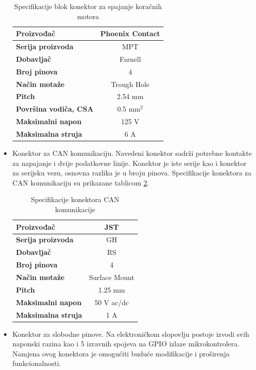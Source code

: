 \documentclass[11pt,a4paper]{article}
\begin{document}
\begin{center}
\begin{itemize}
\begin{table}[H]
	\centering
	\caption{Specifikacije blok konektor za spajanje koračnih motora}
	\label{tab:specifikacija_connector_terminal}
	\begin{tabular}{|l|c|}
		\hline
		\textbf{Proizvođač} & Phoenix Contact \\ \hline 
		\textbf{Serija proizvoda} & MPT \\ \hline 
		\textbf{Dobavljač} & Farnell \\ \hline 
		\textbf{Broj pinova} & 4 \\ \hline 
		\textbf{Način motaže} & Trough Hole    \\ \hline
		\textbf{Pitch} & 2.54 mm    \\ \hline 
		\textbf{Površina vodiča, CSA} & 0.5 mm$^2$     \\ \hline 
		\textbf{Maksimalni napon} & 125 V \\ \hline 
		\textbf{Maksimalna struja} & 6 A \\ \hline
	\end{tabular}
\end{table}
		
		
		\item Konektor za CAN komunikaciju. Navedeni konektor sadrži potrebne kontakte za napajanje i dvije podatkovne linije. Konektor je iste serije kao i konektor za serijsku vezu, osnovna razlika je u broju pinova. Specifikacije konektora za CAN komunikaciju su prikazane tablicom \ref{tab:specifikacija_connector_CAN}.
		
\begin{table}[H]
	\centering
	\caption{Specifikacije konektora CAN komunikacije}
	\label{tab:specifikacija_connector_CAN}
	\begin{tabular}{|l|c|}
		\hline
		\textbf{Proizvođač} & JST \\ \hline 
		\textbf{Serija proizvoda} & GH \\ \hline 
		\textbf{Dobavljač} & RS \\ \hline 
		\textbf{Broj pinova} & 4 \\ \hline 
		\textbf{Način motaže} & Surface Mount    \\ \hline
		\textbf{Pitch} & 1.25 mm    \\ \hline 
		\textbf{Maksimalni napon} & 50 V  ac/dc\\ \hline 
		\textbf{Maksimalna struja} & 1 A \\ \hline
	\end{tabular}
\end{table}
		
		
		\item Konektor za slobodne pinove. Na elektroničkom slopovlju postoje izvodi svih naponski razina kao i 5 izravnih spojeva na GPIO izlaze mikrokontrolera. Namjena ovog konektora je omogućiti buduće modifikacije i proširenja funkcionalnosti.	
		
	\end{itemize}
\end{center}
\end{document}
